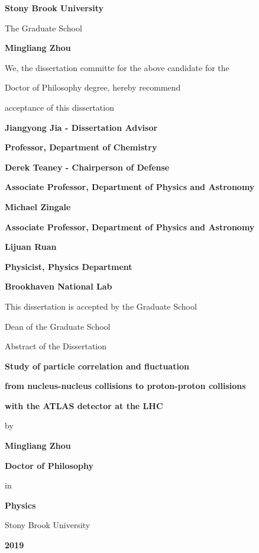 \documentclass[12pt]{article}
\begin{document}
\centerline{\bf{Stony Brook University}}
\vspace*{1\baselineskip}
\centerline{The Graduate School}
\vspace*{2\baselineskip}
\centerline{\bf{Mingliang Zhou}}
\vspace*{2\baselineskip}
\centerline{We, the dissertation committe for the above candidate for the}
\vspace*{1\baselineskip}
\centerline{Doctor of Philosophy degree, hereby recommend}
\vspace*{1\baselineskip}
\centerline{acceptance of this dissertation}
\vspace*{2\baselineskip}
\centerline{\bf{Jiangyong Jia - Dissertation Advisor}}
\centerline{\bf{Professor, Department of Chemistry}}
\vspace*{2\baselineskip}
\centerline{\bf{Derek Teaney - Chairperson of Defense}}
\centerline{\bf{Associate Professor, Department of Physics and Astronomy}}
\vspace*{2\baselineskip}
\centerline{\bf{Michael Zingale}}
\centerline{\bf{Associate Professor, Department of Physics and Astronomy}} 
\vspace*{2\baselineskip}
\centerline{\bf{Lijuan Ruan}}
\centerline{\bf{Physicist, Physics Department}}
\centerline{\bf{Brookhaven National Lab}}
\vspace*{2\baselineskip}
\centerline{This dissertation is accepted by the Graduate School}
\vspace*{3\baselineskip}
\centerline{Dean of the Graduate School}

\newpage

\centerline{Abstract of the Dissertation}
\vspace*{1\baselineskip}
\centerline{\bf{Study of particle correlation and fluctuation}}
\centerline{\bf{from nucleus-nucleus collisions to proton-proton collisions}}
\centerline{\bf{with the ATLAS detector at the LHC}}
\vspace*{1\baselineskip}
\centerline{by}
\vspace*{1\baselineskip}
\centerline{\bf{Mingliang Zhou}}
\vspace*{1\baselineskip}
\centerline{\bf{Doctor of Philosophy}}
\vspace*{1\baselineskip}
\centerline{in}
\vspace*{1\baselineskip}
\centerline{\bf{Physics}}
\vspace*{1\baselineskip}
\centerline{Stony Brook University}
\vspace*{1\baselineskip}
\centerline{\bf{2019}}
\vspace*{2\baselineskip}
\end{document}
